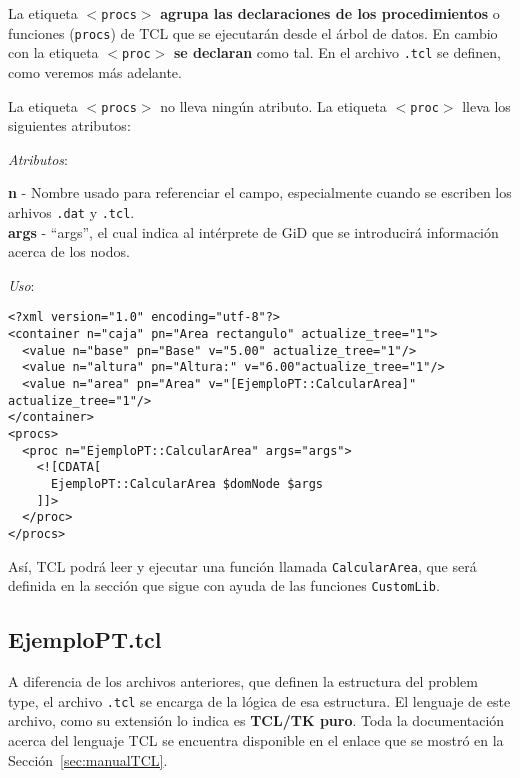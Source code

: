 \documentclass[10pt, a4paper, twocolumn]{article} %
\begin{document}
La etiqueta \texttt{$<$procs$>$} \textbf{agrupa las declaraciones de los procedimientos} o funciones (\texttt{procs}) de TCL que se ejecutarán desde el árbol de datos. En cambio con la etiqueta \texttt{$<$proc$>$} \textbf{se declaran} como tal. En el archivo \texttt{.tcl} se definen, como veremos más adelante.

La etiqueta \texttt{$<$procs$>$} no lleva ningún atributo. La etiqueta \texttt{$<$proc$>$} lleva los siguientes atributos:

\vspace{0.15cm}
\textit{Atributos}:

\vspace{0.15cm}
	\textbf{n} - Nombre usado para referenciar el campo, especialmente cuando se escriben los arhivos \texttt{.dat} y \texttt{.tcl}.\\
	\textbf{args} - ``args'', el cual indica al intérprete de GiD que se introducirá información acerca de los nodos.\\
\vspace{0.15cm}

\textit{Uso}:
\vspace{0.15cm}

\lstset{language=XML} 
\begin{lstlisting}[caption={Uso de <procs> y <proc> para invocar rutinas de TCL en XML. Nótese el uso de la función del namespace EjemploPT}]
<?xml version="1.0" encoding="utf-8"?>
<container n="caja" pn="Area rectangulo" actualize_tree="1">
  <value n="base" pn="Base" v="5.00" actualize_tree="1"/>
  <value n="altura" pn="Altura:" v="6.00"actualize_tree="1"/>
  <value n="area" pn="Area" v="[EjemploPT::CalcularArea]" actualize_tree="1"/>
</container>
<procs>
  <proc n="EjemploPT::CalcularArea" args="args">
    <![CDATA[
      EjemploPT::CalcularArea $domNode $args
    ]]>
  </proc>
</procs>
\end{lstlisting}

Así, TCL podrá leer y ejecutar una función llamada \texttt{CalcularArea}, que será definida en la sección que sigue con ayuda de las funciones \texttt{CustomLib}.


\subsection{EjemploPT.tcl}

A diferencia de los archivos anteriores, que definen la estructura del problem type, el archivo \texttt{.tcl} se encarga de la lógica de esa estructura. El lenguaje de este archivo, como su extensión lo indica es \textbf{TCL/TK puro}. Toda la documentación acerca del lenguaje TCL se encuentra disponible en el enlace que se mostró en la Sección~\ref{sec:manualTCL}.
\end{document}
